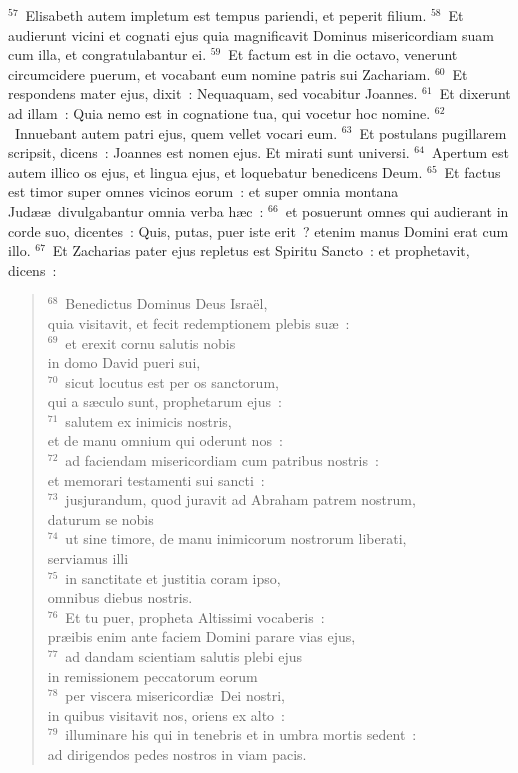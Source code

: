 ${}^{57}$~Elisabeth autem impletum est tempus pariendi, et peperit filium.
${}^{58}$~Et audierunt vicini et cognati ejus quia magnificavit Dominus misericordiam suam cum illa, et congratulabantur ei.
${}^{59}$~Et factum est in die octavo, venerunt circumcidere puerum, et vocabant eum nomine patris sui Zachariam.
${}^{60}$~Et respondens mater ejus, dixit~: Nequaquam, sed vocabitur Joannes.
${}^{61}$~Et dixerunt ad illam~: Quia nemo est in cognatione tua, qui vocetur hoc nomine.
${}^{62}$~Innuebant autem patri ejus, quem vellet vocari eum.
${}^{63}$~Et postulans pugillarem scripsit, dicens~: Joannes est nomen ejus. Et mirati sunt universi.
${}^{64}$~Apertum est autem illico os ejus, et lingua ejus, et loquebatur benedicens Deum.
${}^{65}$~Et factus est timor super omnes vicinos eorum~: et super omnia montana Jud\ae \ae\ divulgabantur omnia verba h\ae c~:
${}^{66}$~et posuerunt omnes qui audierant in corde suo, dicentes~: Quis, putas, puer iste erit~? etenim manus Domini erat cum illo.
${}^{67}$~Et Zacharias pater ejus repletus est Spiritu Sancto~: et prophetavit, dicens~:
\begin{flushleft}\begin{verse}${}^{68}$~Benedictus Dominus Deus Isra\"el,\\ quia visitavit, et fecit redemptionem plebis su\ae~:\\
${}^{69}$~et erexit cornu salutis nobis\\ in domo David pueri sui,\\
${}^{70}$~sicut locutus est per os sanctorum,\\ qui a s\ae culo sunt, prophetarum ejus~:\\
${}^{71}$~salutem ex inimicis nostris,\\ et de manu omnium qui oderunt nos~:\\
${}^{72}$~ad faciendam misericordiam cum patribus nostris~:\\ et memorari testamenti sui sancti~:\\
${}^{73}$~jusjurandum, quod juravit ad Abraham patrem nostrum,\\ daturum se nobis\\
${}^{74}$~ut sine timore, de manu inimicorum nostrorum liberati,\\ serviamus illi\\
${}^{75}$~in sanctitate et justitia coram ipso,\\ omnibus diebus nostris.\\
${}^{76}$~Et tu puer, propheta Altissimi vocaberis~:\\ pr\ae ibis enim ante faciem Domini parare vias ejus,\\
${}^{77}$~ad dandam scientiam salutis plebi ejus\\ in remissionem peccatorum eorum\\
${}^{78}$~per viscera misericordi\ae\ Dei nostri,\\ in quibus visitavit nos, oriens ex alto~:\\
${}^{79}$~illuminare his qui in tenebris et in umbra mortis sedent~:\\ ad dirigendos pedes nostros in viam pacis.\end{verse}\end{flushleft}


